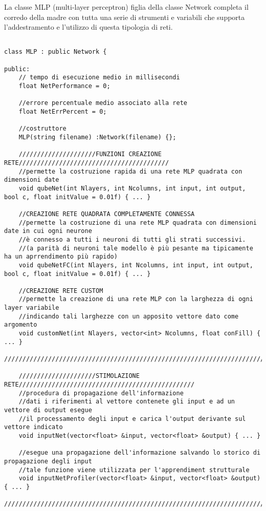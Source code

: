 \documentclass[10pt,a4paper]{article}
\begin{document}
La classe MLP (multi-layer perceptron) figlia della classe Network completa il corredo della madre con tutta una serie di strumenti e variabili che supporta l'addestramento e l'utilizzo di questa tipologia di reti.
\begin{lstlisting}[style=mycuda, caption=class MLP, captionpos=b]

class MLP : public Network {

public:
	// tempo di esecuzione medio in millisecondi
	float NetPerformance = 0; 
	
	//errore percentuale medio associato alla rete
	float NetErrPercent = 0; 
	
	//costruttore
	MLP(string filename) :Network(filename) {};

	/////////////////////FUNZIONI CREAZIONE RETE/////////////////////////////////////////
	//permette la costruzione rapida di una rete MLP quadrata con dimensioni date
	void qubeNet(int Nlayers, int Ncolumns, int input, int output, bool c, float initValue = 0.01f) { ... }
	
	//CREAZIONE RETE QUADRATA COMPLETAMENTE CONNESSA
	//permette la costruzione di una rete MLP quadrata con dimensioni date in cui ogni neurone
	//è connesso a tutti i neuroni di tutti gli strati successivi.
	//(a parità di neuroni tale modello è più pesante ma tipicamente ha un aprrendimento più rapido)
	void qubeNetFC(int Nlayers, int Ncolumns, int input, int output, bool c, float initValue = 0.01f) { ... }
	
	//CREAZIONE RETE CUSTOM
	//permette la creazione di una rete MLP con la larghezza di ogni layer variabile
	//indicando tali larghezze con un apposito vettore dato come argomento
	void customNet(int Nlayers, vector<int> Ncolumns, float conFill) { ... }
	//////////////////////////////////////////////////////////////////////////////////////
	
	/////////////////////STIMOLAZIONE RETE////////////////////////////////////////////////
	//procedura di propagazione dell'informazione
	//dati i riferimenti al vettore contenete gli input e ad un vettore di output esegue
	//il processamento degli input e carica l'output derivante sul vettore indicato
	void inputNet(vector<float> &input, vector<float> &output) { ... }
	
	//esegue una propagazione dell'informazione salvando lo storico di propagazione degli input
	//tale funzione viene utilizzata per l'apprendiment strutturale
	void inputNetProfiler(vector<float> &input, vector<float> &output) { ... }
	//////////////////////////////////////////////////////////////////////////////////////
	

\end{lstlisting}
\end{document}

